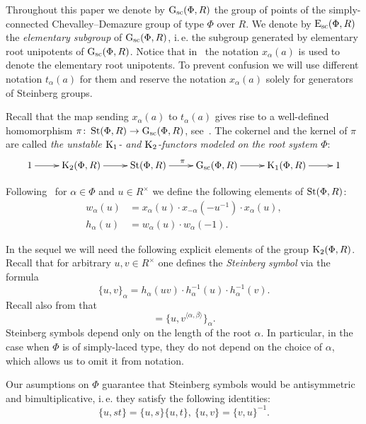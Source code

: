 Throughout this paper we denote by $\operatorname{G}_\mathrm{sc}(\Phi, R)$ the group of points of the simply-connected Chevalley--Demazure group of type $\Phi$ over $R$.
We denote by $\operatorname{E}_\mathrm{sc}(\Phi, R)$ the \textit{elementary subgroup} of $\operatorname{G}_\mathrm{sc}(\Phi, R)$, i.\,e. the subgroup generated by elementary root unipotents of $\operatorname{G}_\mathrm{sc}(\Phi, R)$.
Notice that in~\cite{VP, Vav09} the notation $x_\alpha(a)$ is used to denote the elementary root unipotents.
To prevent confusion we will use different notation $t_\alpha(a)$ for them and reserve the notation $x_\alpha(a)$ solely for generators of Steinberg groups.

Recall that the map sending $x_\alpha(a)$ to $t_\alpha(a)$ gives rise to a well-defined homomorphism $\pi \colon \operatorname{St}(\Phi, R) \to \operatorname{G}_\mathrm{sc}(\Phi, R)$, see~\cite[\S~1A]{St78}.
The cokernel and the kernel of $\pi$ are called \textit{the unstable $\operatorname{K}_1$- and $\operatorname{K}_2$-functors modeled on the root system $\Phi$}:
\begin{equation} \label{eq:K1-K2-sequence}
  \xymatrix{ 1 \ar[r] & \K_2(\Phi, R) \ar[r] & \St(\Phi, R) \ar[r]^{\pi} & \Gsc(\Phi, R) \ar[r] & \K_1(\Phi, R) \ar[r] & 1}
\end{equation}

Following~\cite{Ma69} for $\alpha\in\Phi$ and $u \in R^\times$ we define the following elements of $\operatorname{St}(\Phi, R)$:
\begin{align*} w_\alpha(u) & =  x_\alpha(u) \cdot x_{-\alpha}(-u^{-1}) \cdot x_\alpha(u), \\
               h_\alpha(u) & =  w_\alpha(u) \cdot w_\alpha(-1).  \end{align*}

In the sequel we will need the following explicit elements of the group $\operatorname{K}_2(\Phi, R)$.
Recall that for arbitrary $u, v \in R^\times$ one defines the \textit{Steinberg symbol} via the formula
\begin{equation} \label{eq:steinberg} \{ u, v \}_\alpha = h_\alpha(uv) \cdot h_\alpha^{-1}(u) \cdot h_\alpha^{-1}(v). \end{equation}
Recall also from \cite[Lemme~5.4]{Ma69} that
\begin{equation} [h_\alpha(u), h_\beta(v)] = \{u, v^{\langle \alpha, \beta \rangle}\}_\alpha. \end{equation}
Steinberg symbols depend only on the length of the root $\alpha$.
In particular, in the case when $\Phi$ is of simply-laced type, they do not depend on the choice of $\alpha$, which allows us to omit it from notation.

Our asumptions on $\Phi$ guarantee that Steinberg symbols would be antisymmetric and bimultiplicative, i.\,e. they satisfy the following identities:
\begin{equation} \label{eq:symbol-properties} \{ u, st \} = \{ u, s\} \{ u, t \}, \ \{ u, v \} = \{ v, u\}^{-1}. \end{equation}

